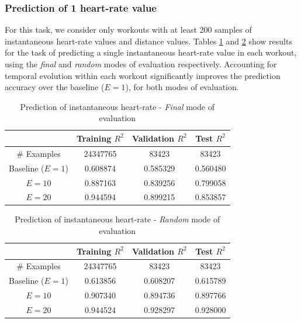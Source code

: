 \documentclass{acm_proc_article-sp}
\begin{document}
\subsubsection{Prediction of 1 heart-rate value}

For this task, we consider only workouts with at least 200 samples of instantaneous heart-rate values and distance values. Tables \ref{tableInstHrFinal} and \ref{tableInstHrRandom} show results for the task of predicting a single instantaneous heart-rate value in each workout, using the \emph{final} and \emph{random} modes of evaluation respectively. Accounting for temporal evolution within each workout significantly improves the prediction accuracy over the baseline ($E = 1$), for both modes of evaluation.

\begin{table}[H]
\centering
\begin{tabular}{|c|c|c|c|} \hline
& Training $R^2$ & Validation $R^2$ & Test $R^2$ \\ \hline
\# Examples & 24347765 & 83423  & 83423  \\ \hline
Baseline ($E = 1$) & 0.608874 & 0.585329 & 0.560480 \\ \hline
$E = 10$ & 0.887163 & 0.839256 & 0.799058 \\ \hline
$E = 20$ & 0.944594 & 0.899215 & 0.853857  \\ \hline
\end{tabular}
\caption{Prediction of instantaneous heart-rate - \emph{Final} mode of evaluation }
\label{tableInstHrFinal}
\end{table}

\begin{table}[H]
\centering
\begin{tabular}{|c|c|c|c|} \hline
& Training $R^2$ & Validation $R^2$ & Test $R^2$ \\ \hline
\# Examples & 24347765  & 83423  & 83423  \\ \hline
Baseline ($E = 1$) & 0.613856 & 0.608207 & 0.615789 \\ \hline
$E = 10$ & 0.907340 & 0.894736 & 0.897766 \\ \hline
$E = 20$ & 0.944524 & 0.928297 & 0.928000 \\ \hline
\end{tabular}
\caption{Prediction of instantaneous heart-rate - \emph{Random} mode of evaluation }
\label{tableInstHrRandom}
\end{table}
\end{document}

